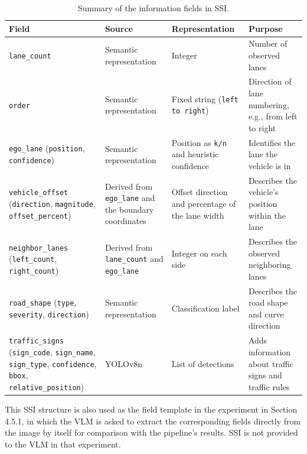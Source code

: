 \documentclass[12pt,a4paper]{report}
\begin{document}
\begin{table}[!htbp]
    \centering
    \small
    \renewcommand{\arraystretch}{1.25}
    \caption{Summary of the information fields in SSI.}
    \label{tab:3.7}
    \begin{tabularx}{\linewidth}{
        >{\RaggedRight\arraybackslash}p{3.6cm}
        >{\RaggedRight\arraybackslash}p{2.8cm}
        >{\RaggedRight\arraybackslash}p{3.0cm}
        >{\RaggedRight\arraybackslash}X
    }
        \toprule
        \textbf{Field} & \textbf{Source} & \textbf{Representation} & \textbf{Purpose} \\
        \midrule
        \texttt{lane\_count} & Semantic representation & Integer & Number of observed lanes \\
        \texttt{order} & Semantic representation & Fixed string (\texttt{left to right}) & Direction of lane numbering, e.g., from left to right \\
        \texttt{ego\_lane} (\texttt{position}, \texttt{confidence}) & Semantic representation & Position as \texttt{k/n} and heuristic confidence & Identifies the lane the vehicle is in \\
        \texttt{vehicle\_offset} (\texttt{direction}, \texttt{magnitude}, \texttt{offset\_percent}) & Derived from \texttt{ego\_lane} and the boundary coordinates & Offset direction and percentage of the lane width & Describes the vehicle's position within the lane \\
        \texttt{neighbor\_lanes} (\texttt{left\_count}, \texttt{right\_count}) & Derived from \texttt{lane\_count} and \texttt{ego\_lane} & Integer on each side & Describes the observed neighboring lanes \\
        \texttt{road\_shape} (\texttt{type}, \texttt{severity}, \texttt{direction}) & Semantic representation & Classification label & Describes the road shape and curve direction \\
        \texttt{traffic\_signs} (\texttt{sign\_code}, \texttt{sign\_name}, \texttt{sign\_type}, \texttt{confidence}, \texttt{bbox}, \texttt{relative\_position}) & YOLOv8n & List of detections & Adds information about traffic signs and traffic rules \\
        \bottomrule
    \end{tabularx}
\end{table}

This SSI structure is also used as the field template in the experiment in Section 4.5.1, in which the VLM is asked to extract the corresponding fields directly from the image by itself for comparison with the pipeline's results. SSI is not provided to the VLM in that experiment.
\end{document}
